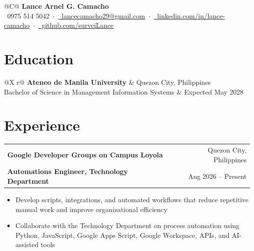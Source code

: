 \documentclass[a4paper,10pt]{article}
\makeatletter
\newenvironment{highlights}{
    \begin{itemize}[
        topsep=0cm,
        parsep=0cm,
        partopsep=0cm,
        itemsep=0.01cm,
        leftmargin=0.48cm
    ]
}{
    \end{itemize}
}
\newcommand{\entryhead}[4]{%
\vspace{0.16cm}
\begin{tabularx}{\linewidth}{@{}X r@{}}
\textbf{#1} & #2 \\
\textbf{#3} & #4 \\
\end{tabularx}%
\vspace{-0.34cm}
}
\makeatother
\begin{document}
\pagestyle{empty}

\begin{tabularx}{\linewidth}{@{}C@{}}
\textbf{\fontsize{18pt}{18pt}\selectfont Lance Arnel G. Camacho} \\[0.03cm]

\small
\raisebox{-0.05\height}\faMobile\
0975 514 5042
\,$\cdot$\,
\href{mailto:lancecamacho29@gmail.com}
{\raisebox{-0.05\height}\faEnvelope\ lancecamacho29@gmail.com}
\,$\cdot$\,
\href{https://www.linkedin.com/in/lance-camacho/}
{\raisebox{-0.05\height}\faLinkedin\ linkedin.com/in/lance-camacho}
\,$\cdot$\,
\href{https://github.com/surveiLance}
{\raisebox{-0.05\height}\faGithub\ github.com/surveiLance}
\\
\end{tabularx}

\section{Education}

\begin{tabularx}{\linewidth}{@{}X r@{}}
\textbf{Ateneo de Manila University} & Quezon City, Philippines \\
Bachelor of Science in Management Information Systems &
Expected May 2028 \\
\end{tabularx}

\section{Experience}

\vspace{-0.20cm}

\entryhead
{Google Developer Groups on Campus Loyola}
{Quezon City, Philippines}
{Automations Engineer, Technology Department}
{Aug 2026 -- Present}

\begin{highlights}
    \item Develop scripts, integrations, and automated workflows that reduce
    repetitive manual work and improve organizational efficiency

    \item Collaborate with the Technology Department on process automation using
    Python, JavaScript, Google Apps Script, Google Workspace, APIs, and
    AI-assisted tools
\end{highlights}
\end{document}
